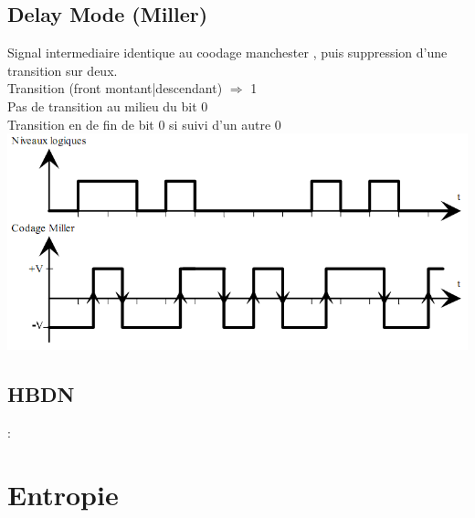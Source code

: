 \documentclass[a4paper,8pt,openany]{book}
\begin{document}
\subsection{Delay Mode (Miller)}
Signal intermediaire identique au coodage manchester , puis suppression d'une transition sur deux.\\
Transition (front montant|descendant) $\Rightarrow$ 1\\
Pas de transition au milieu du bit 0\\
Transition en de fin de bit 0 si suivi d'un autre 0\\
\includegraphics[width=1\linewidth]{img/code_miller.png}
\\



\subsection{HBDN} : \\

\section{Entropie}
\end{document}
